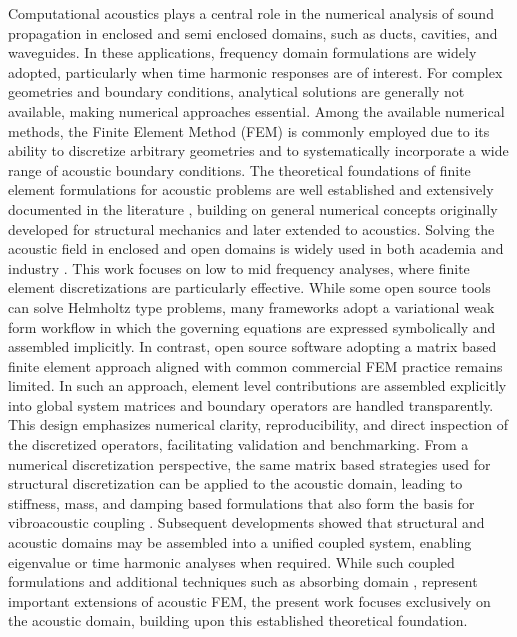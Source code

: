 \documentclass{jors}
\begin{document}
Computational acoustics plays a central role in the numerical analysis of sound propagation in enclosed and semi enclosed domains, such as ducts, cavities, and waveguides. In these applications, frequency domain formulations are widely adopted, particularly when time harmonic responses are of interest. For complex geometries and boundary conditions, analytical solutions are generally not available, making numerical approaches essential. Among the available numerical methods, the Finite Element Method (FEM) is commonly employed due to its ability to discretize arbitrary geometries and to systematically incorporate a wide range of acoustic boundary conditions. The theoretical foundations of finite element formulations for acoustic problems are well established and extensively documented in the literature \cite{MacNeal1994,Desmet1999,Ihlenburg1995,Babuska1988,Prinn2023}, building on general numerical concepts originally developed for structural mechanics and later extended to acoustics. Solving the acoustic field in enclosed and open domains is widely used in both academia and industry \cite{HelmholtzResonator2012,Thompson2006,Harari2006, Khalefa2024}. This work focuses on low to mid frequency analyses, where finite element discretizations are particularly effective. While some open source tools can solve Helmholtz type problems, many frameworks adopt a variational weak form workflow in which the governing equations are expressed symbolically and assembled implicitly. In contrast, open source software adopting a matrix based finite element approach aligned with common commercial FEM practice remains limited. In such an approach, element level contributions are assembled explicitly into global system matrices and boundary operators are handled transparently. This design emphasizes numerical clarity, reproducibility, and direct inspection of the discretized operators, facilitating validation and benchmarking. 
From a numerical discretization perspective, the same matrix based strategies used for structural discretization can be applied to the acoustic domain, leading to stiffness, mass, and damping based formulations that also form the basis for vibroacoustic coupling \cite{Nefske1976,Beriot2021} . Subsequent developments showed that structural and acoustic domains may be assembled into a unified coupled system, enabling eigenvalue or time harmonic analyses when required. While such coupled formulations and additional techniques such as absorbing domain \cite{Turkel1998,Pekel1995,Reheman2013}, represent important extensions of acoustic FEM, the present work focuses exclusively on the acoustic domain, building upon this established theoretical foundation.
\end{document}
